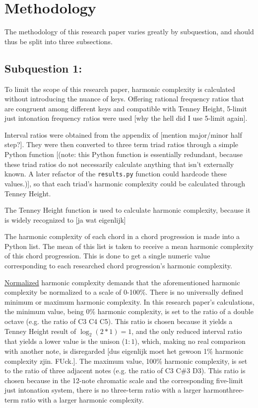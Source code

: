 \section{Methodology}

The methodology of this research paper varies greatly by subquestion, and should thus be split into three subsections.

\subsection{Subquestion 1: \qI}
To limit the scope of this research paper, harmonic complexity is calculated without introducing the nuance of keys. Offering rational frequency ratios that are congruent among different keys and compatible with Tenney Height, 5-limit just intonation frequency ratios were used [why the hell did I use 5-limit again]. 

Interval ratios were obtained from the appendix of \textcite{arithmetic_of_listening} [mention major/minor half step?]. They were then converted to three term triad ratios through a simple Python function [(note: this Python function is essentially redundant, because these triad ratios do not necessarily calculate anything that isn't externally known. A later refactor of the \lstinline[]|results.py| function could hardcode these values.)], so that each triad's harmonic complexity could be calculated through Tenney Height. 

The Tenney Height function is used to calculate harmonic complexity, because it is widely recognized to [ja wat eigenlijk]

The harmonic complexity of each chord in a chord progression is made into a Python list. The mean of this list is taken to receive a mean harmonic complexity of this chord progression. This is done to get a single numeric value corresponding to each researched chord progression's harmonic complexity.

\underline{Normalized} harmonic complexity demands that the aforementioned harmonic complexity be normalized to a scale of 0-100\%. There is no universally defined minimum or maximum harmonic complexity. In this research paper's calculations, the minimum value, being 0\% harmonic complexity, is set to the ratio of a double octave (e.g. the ratio of C3 \: C4 \: C5). This ratio is chosen because it yields a Tenney Height result of $\log_{2}(2 * 1) = 1$, and the only reduced interval ratio that yields a lower value is the unison ($1 : 1$), which, making no real comparison with another note, is disregarded [dus eigenlijk moet het gewoon 1\% harmonic complexity zjin. FUck.]. The maximum value, 100\% harmonic complexity, is set to the ratio of three adjacent notes (e.g. the ratio of C3 \: C\#3 \: D3). This ratio is chosen because in the 12-note chromatic scale and the corresponding five-limit just intonation system, there is no three-term ratio with a larger harmonthree-term ratio with a larger harmonic complexity.

